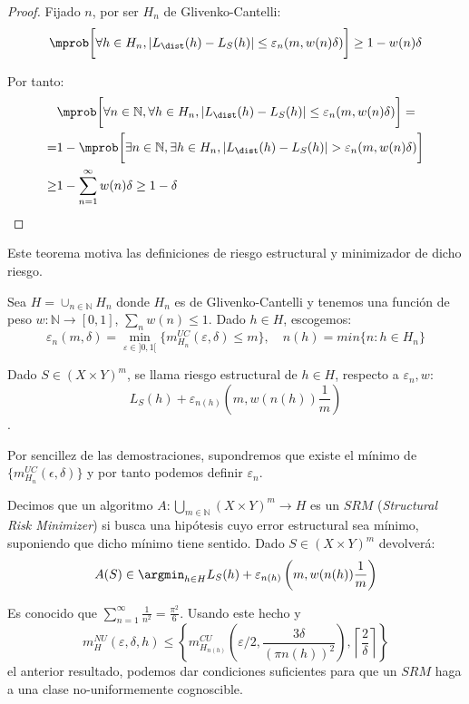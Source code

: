   \begin{proof}
   Fijado $n$, por ser $H_n$ de Glivenko-Cantelli:
   \[
     \mprob\bigg[\forall h\in H_n, |L_{\dist}(h) - L_S(h)| \le \varepsilon_n (m, w(n)\delta)\bigg] \ge 1- w(n) \delta
   \]

   Por tanto:
   \begin{align*}
   &\mprob \bigg[\forall n\in \mathbb{N}, \forall h\in H_n, |L_{\dist}(h) - L_S(h)| \le \varepsilon_n (m, w(n) \delta)\bigg] = \\
  =& 1 - \mprob\bigg[\exists n\in \mathbb{N}, \exists h\in H_n, |L_{\dist}(h) - L_S(h)| > \varepsilon_n (m, w(n) \delta)\bigg] \\
\ge& 1- \sum_{n=1}^{\infty} w(n) \delta \ge 1-\delta
   \end{align*}
  \end{proof}

Este teorema motiva las definiciones de riesgo estructural y minimizador de dicho riesgo.

\begin{definition}
Sea $H = \cup_{n\in \mathbb{N}} H_n$ donde $H_n$ es de Glivenko-Cantelli y tenemos una función de peso
$w : \mathbb{N} \rightarrow [0,1]$, $\sum_n w(n) \le 1$. Dado $h\in H$, escogemos:
\[
  \varepsilon_n (m,\delta) = \min_{\varepsilon \in ]0,1[}\{m_{H_n}^{UC} (\varepsilon, \delta) \le m\}, \quad n(h) = min\{n: h\in H_n\}
\]

Dado $S\in (X\times Y)^m$, se llama riesgo estructural de $h\in H$, respecto a $\varepsilon_n, w$:
\[L_S(h) + \varepsilon_{n(h)} \left(m, w(n(h))\frac{1}{m}\right)\].
\end{definition}

Por sencillez de las demostraciones, supondremos que existe el mínimo de $\{m_{H_n}^{UC}(\epsilon, \delta)\}$ y por tanto
podemos definir $\varepsilon_n$.

\begin{definition}
Decimos que un algoritmo $A: \underset{m\in \mathbb{N}}{\bigcup} (X\times Y)^m \rightarrow H$ es un $SRM$ 
(\textit{Structural Risk Minimizer}) si busca una hipótesis cuyo error estructural sea mínimo, suponiendo que
dicho mínimo tiene sentido. Dado $S \in (X\times Y)^m$ devolverá:
\[
  A(S) \in \argmin_{h\in H} L_S(h) + \varepsilon_{n(h)} \left(m, w(n(h))\frac{1}{m}\right)
\]
\end{definition}

Es conocido que $\sum_{n=1}^\infty \frac{1}{n^2} = \frac{\pi^2}{6}$. Usando este hecho y\[
  m_{H}^{NU} (\varepsilon, \delta, h) \le \left\{m_{H_{n(h)}}^{CU} \left(\varepsilon/2, \frac{3 \delta}{(\pi n(h))^2} \right), 
  \left\lceil\frac{2}{\delta}\right\rceil \right\}
\] el anterior resultado, podemos
dar condiciones suficientes para que un $SRM$ haga a una clase no-uniformemente cognoscible.

